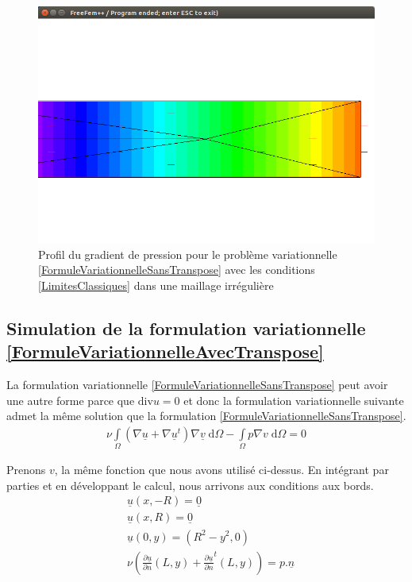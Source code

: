 \documentclass[11pt,a4paper]{article}
\numberwithin{equation}{subsection}
\numberwithin{figure}{subsection}
\begin{document}
\begin{figure}
\centering
\includegraphics[scale=0.4]{StokesConditionsClassiquesPressionIrregulier.png}
\caption{Profil du gradient de pression pour le problème variationnelle \ref{FormuleVariationnelleSansTranspose} avec les conditions \ref{LimitesClassiques} dans une maillage irrégulière}
\label{StokesConditionsClassiquesPressionIrregulier}
\end{figure}

\subsection{Simulation de la formulation variationnelle \ref{FormuleVariationnelleAvecTranspose}}

La formulation variationnelle \ref{FormuleVariationnelleSansTranspose} peut avoir une autre forme parce que $\mathrm{div} u = 0$ et donc la formulation variationnelle suivante admet la même solution que la formulation \ref{FormuleVariationnelleSansTranspose}.
\begin{equation}
\begin{aligned}
\nu \int\limits_\Omega \left(\nabla \underline{u} + \nabla \underline{u}^t\right) \nabla \underline{v} \;\mathrm{d}\Omega - \int\limits_\Omega p\nabla v \; \mathrm{d}\Omega = 0
\label{FormuleVariationnelleAvecTranspose}
\end{aligned}
\end{equation}

Prenons $v$, la même fonction que nous avons utilisé ci-dessus. En intégrant par parties et en développant le calcul, nous arrivons aux conditions aux bords.
\begin{equation}
\begin{aligned}
& \underline{u}(x,-R) = \underline{0} \\
& \underline{u}(x, R) = \underline{0} \\
& \underline{u}(0,y) = \left(R^2 - y^2, 0\right) \\
& \nu\left(\frac{\partial\underline{u}}{\partial n}(L,y) + \frac{\partial\underline{u}}{\partial n}^t(L,y)\right) = p.\underline{n}
\end{aligned} \label{Limites}
\end{equation}
\end{document}
